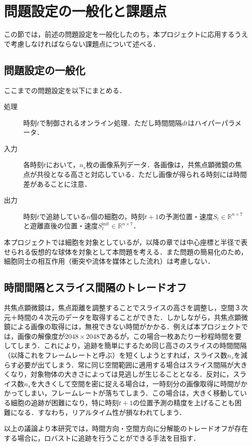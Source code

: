 \section{問題設定の一般化と課題点}
この節では，前述の問題設定を一般化したのち，本プロジェクトに応用するうえで考慮しなければならない課題点について述べる．

\subsection{問題設定の一般化}
ここまでの問題設定を以下にまとめる．
\begin{description}
    \item[処理] 時刻$t$で制御されるオンライン処理．ただし時間間隔$dt$はハイパーパラメータ．
    \item[入力] 各時刻$t$において，$n_s$枚の画像系列データ．各画像は，共焦点顕微鏡の焦点が共役となる高さと対応している．ただし画像が得られる時刻には時間差があることに注意．
    \item[出力] 時刻$t$で追跡している$n$個の細胞の，時刻$t+1$の予測位置・速度$S_t \in \mathbb{R}^{n \times 7}$と遊離直後の位置・速度$S_t^{\textrm{init}} \in \mathbb{R}^{n \times 7}$．
\end{description}
\par
本プロジェクトでは細胞を対象としているが，以降の章では中心座標と半径で表せられる仮想的な球体を対象として本問題を考える．また問題の簡易化のため，細胞同士の相互作用（衝突や流体を媒体とした流れ）は考慮しない．

\subsection{時間間隔とスライス間隔のトレードオフ}
共焦点顕微鏡は，焦点距離を調整することでスライスの高さを調整し，空間３次元＋時間の４次元のデータを取得することができた．しかしながら，共焦点顕微鏡による画像の取得には，無視できない時間がかかる．例えば本プロジェクトでは，画像の解像度が$2048 \times 2048$であるが，この場合一枚あたり一秒程時間を要してしまう．これにより，追跡を簡単にするため同じ高さのスライスの時間間隔（以降これをフレームレートと呼ぶ）を短くしようとすれば，スライス数$n_s$を減らす必要が出てしまう．常に同じ空間範囲に適用する場合はスライス間隔が大きくなり，対象物体の大きさによっては見逃しが生じることとなる．反対に，スライス数$n_s$を大きくして空間を密に捉える場合は，一時刻分の画像取得に時間がかかってしまい，フレームレートが落ちてしまう．この場合は，大きく移動している細胞の追跡が困難になり，特に時刻$t+1$の位置予測の精度を上げることも困難になる．すなわち，リアルタイム性が損なわれてしまう．
\par
以上の議論より本研究では，時間方向・空間方向に分解能のトレードオフが存在する場合に，ロバストに追跡を行うことができる手法を目指す．
